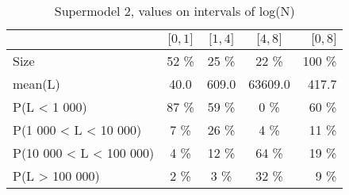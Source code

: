 \documentclass[numbered]{CSL}
\begin{document}
\setlength{\tabcolsep}{0.5em}
\begin{table}
\centering
\caption{Supermodel 2, values on intervals of log(N) \label{table:NSupermodel2}}
\begin{tabular}{l|ccc|r}
\toprule
{} & \small{$\lbrack 0, 1 \rbrack$} & \small{$\lbrack 1, 4 \rbrack$} & \small{$\lbrack 4, 8 \rbrack$} & \small{$\lbrack 0, 8 \rbrack$} \\
\midrule
Size                    &               52 \% &               25 \% &               22 \% &              100 \% \\
mean(L)                 &               40.0 &              609.0 &            63609.0 &              417.7 \\
P(L < 1 000)            &               87 \% &               59 \% &                0 \% &               60 \% \\
P(1 000 < L < 10 000)   &                7 \% &               26 \% &                4 \% &               11 \% \\
P(10 000 < L < 100 000) &                4 \% &               12 \% &               64 \% &               19 \% \\
P(L > 100 000)          &                2 \% &                3 \% &               32 \% &                9 \% \\
\bottomrule
\end{tabular}
\end{table}
\end{document}
